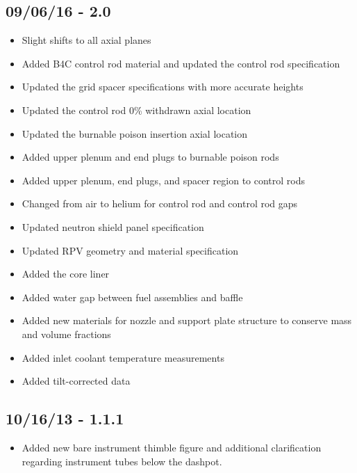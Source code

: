 \subsection*{09/06/16 - 2.0}
\begin{itemize}
  \item Slight shifts to all axial planes
  \item Added B4C control rod material and updated the control rod specification
  \item Updated the grid spacer specifications with more accurate heights
  \item Updated the control rod 0\% withdrawn axial location
  \item Updated the burnable poison insertion axial location
  \item Added upper plenum and end plugs to burnable poison rods
  \item Added upper plenum, end plugs, and spacer region to control rods
  \item Changed from air to helium for control rod and control rod gaps
  \item Updated neutron shield panel specification
  \item Updated RPV geometry and material specification
  \item Added the core liner
  \item Added water gap between fuel assemblies and baffle
  \item Added new materials for nozzle and support plate structure to conserve
        mass and volume fractions
  \item Added inlet coolant temperature measurements
  \item Added tilt-corrected data
\end{itemize}

\subsection*{10/16/13 - 1.1.1}
\begin{itemize}
  \item Added new bare instrument thimble figure and additional clarification
  regarding instrument tubes below the dashpot.
\end{itemize}

